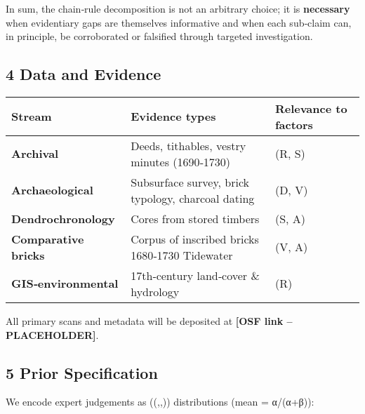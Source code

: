\documentclass[
  11pt,
]{article}
\begin{document}
In sum, the chain‑rule decomposition is not an arbitrary choice; it is
\textbf{necessary} when evidentiary gaps are themselves informative and
when each sub‑claim can, in principle, be corroborated or falsified
through targeted investigation.

\subsection{4 Data and Evidence}\label{data-and-evidence}

\begin{longtable}[]{@{}
  >{\raggedright\arraybackslash}p{}
  >{\raggedright\arraybackslash}p{}
  >{\raggedright\arraybackslash}p{}@{}}
\toprule\noalign{}
\begin{minipage}[b]{\linewidth}\raggedright
Stream
\end{minipage} & \begin{minipage}[b]{\linewidth}\raggedright
Evidence types
\end{minipage} & \begin{minipage}[b]{\linewidth}\raggedright
Relevance to factors
\end{minipage} \\
\midrule\noalign{}
\endhead
\bottomrule\noalign{}
\endlastfoot
\textbf{Archival} & Deeds, tithables, vestry minutes (1690‑1730) & (R,
S) \\
\textbf{Archaeological} & Subsurface survey, brick typology, charcoal
dating & (D, V) \\
\textbf{Dendrochronology} & Cores from stored timbers & (S, A) \\
\textbf{Comparative bricks} & Corpus of inscribed bricks 1680‑1730
Tidewater & (V, A) \\
\textbf{GIS‑environmental} & 17th‑century land‑cover \& hydrology &
(R) \\
\end{longtable}

All primary scans and metadata will be deposited at \textbf{{[}OSF link
-- PLACEHOLDER{]}}.

\subsection{5 Prior Specification}\label{prior-specification}

We encode expert judgements as ((\alpha,,\beta))
distributions (mean = α/(α+β)):
\end{document}

